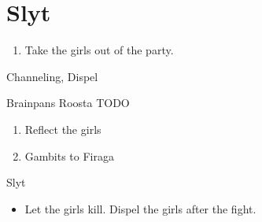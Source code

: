 \chapter{Slyt}

\begin{enumerate}
\item Take the girls out of the party.
\end{enumerate}
\begin{liscense}
\ashe Channeling, Dispel
\end{liscense}
\begin{battle}{Brainpans}
Roosta TODO
\end{battle}
\begin{enumerate}
\item Reflect the girls
\item Gambits to Firaga
\end{enumerate}
\begin{battle}{Slyt}
\begin{itemize}
\item Let the girls kill. Dispel the girls after the fight.
\end{itemize}
\end{battle}
